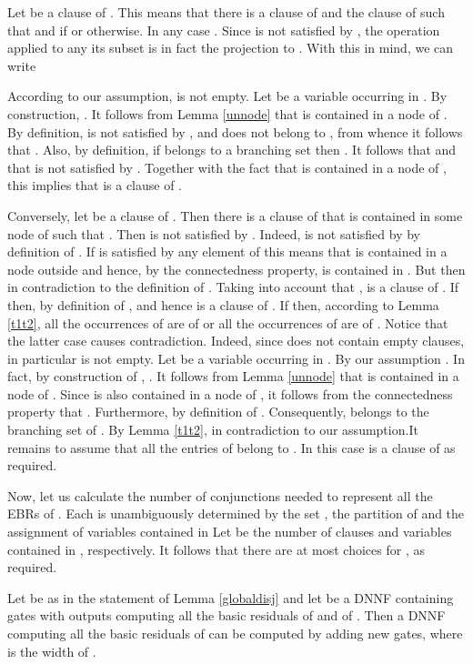 \documentclass{llncs}
\begin{document}
Let  be a clause of . This means that there is a clause  of  and the clause
 of  such that  and  if  or
 otherwise. In any case .
Since  is not satisfied by , the operation  applied to any its subset is in
fact the projection to . With this in mind, we can write

According to our assumption,  is not empty. Let  be a variable occurring in .
By construction, . It follows from Lemma \ref{unnode}
that  is contained in a node of . By definition,  is not satisfied
by , and does not belong to , from whence it follows that .  
Also, by definition, if  belongs to a branching set then .
It follows that  and that  is not satisfied by .
Together with the fact that  is contained in a node of , this implies that
 is a clause of .

Conversely, let  be a clause of . Then there is a clause  of  that is contained
in some node of  such that . Then  is not satisfied by .
Indeed,  is not satisfied by  by definition of . If  is satisfied by
any element of  this means that  is contained in a node outside  and hence,
by the connectedness property,  is contained in . But then  in contradiction to the 
definition of . Taking into account that , 
is a clause of .  If  then, by definition of , 
and hence  is a clause of . If  then, according to
Lemma \ref{t1t2}, all the occurrences of  are of  or all the
occurrences of  are of . Notice that the latter case causes
contradiction. Indeed, since  does not contain empty clauses,  in particular is
not empty. Let  be a variable occurring in . By our assumption . 
In fact, by construction of , . It follows from Lemma \ref{unnode}
that  is contained in a node of . Since  is also contained in a node of , it follows from the
connectedness property that . Furthermore,  by definition
of . Consequently,  belongs to the branching set of . By Lemma \ref{t1t2},
 in contradiction to our assumption.It remains to assume that all the entries of 
belong to . In this case  is a clause of 
as required. 





Now, let us calculate the number of conjunctions  needed to represent all the EBRs of .
Each  is unambiguously determined by the set
, the partition  of  and the assignment of variables
contained in  Let  be the number of clauses and variables contained in , respectively. It follows that there
are at most  choices for , as required. 



\begin{lemma} \label{layerdnnf}
Let  be as in the statement of Lemma \ref{globaldisj} and let  be a DNNF  containing gates with outputs computing all the basic residuals of  and of .
Then a DNNF computing all the basic residuals of  can be computed by adding  new
gates, where  is the width of .
\end{lemma}
\end{document}
